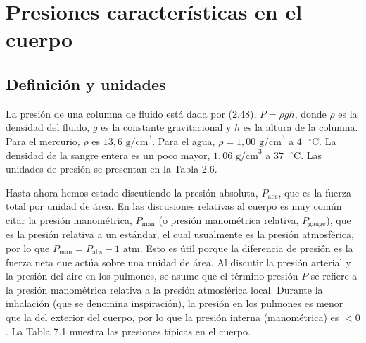 \documentclass[12pt]{book}
\begin{document}
\section{Presiones características en el cuerpo}

\subsection{Definición y unidades}

La presión de una columna de fluido está dada por (2.48), $P = \rho g h$, donde $\rho$ es la densidad del fluido, $g$ es la constante gravitacional y $h$ es la altura de la columna. Para el mercurio, $\rho$ es $13{,}6\text{ g/cm}^{3}$. Para el agua, $\rho = 1{,}00\text{ g/cm}^{3}$ a $4\text{ }^\circ\text{C}$. La densidad de la sangre entera es un poco mayor, $1{,}06\text{ g/cm}^{3}$ a $37\text{ }^\circ\text{C}$. Las unidades de presión se presentan en la Tabla 2.6.

Hasta ahora hemos estado discutiendo la presión absoluta, $P_{\text{abs}}$, que es la fuerza total por unidad de área. En las discusiones relativas al cuerpo es muy común citar la presión manométrica, $P_{\text{man}}$ (o presión manométrica relativa, $P_{\text{gauge}}$), que es la presión relativa a un estándar, el cual usualmente es la presión atmosférica, por lo que $P_{\text{man}} = P_{\text{abs}} - 1\text{ atm}$. Esto es útil porque la diferencia de presión es la fuerza neta que actúa sobre una unidad de área. Al discutir la presión arterial y la presión del aire en los pulmones, se asume que el término presión $P$ se refiere a la presión manométrica relativa a la presión atmosférica local. Durante la inhalación (que se denomina inspiración), la presión en los pulmones es menor que la del exterior del cuerpo, por lo que la presión interna (manométrica) es $<0$. La Tabla 7.1 muestra las presiones típicas en el cuerpo.
\end{document}
